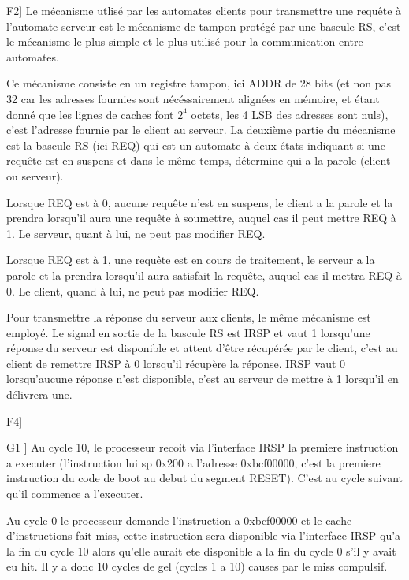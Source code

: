 \documentclass{article}
\begin{document}
F2]
Le mécanisme utlisé par les automates clients pour transmettre une requête
à l'automate serveur est le mécanisme de tampon protégé par une bascule RS,
c'est le mécanisme le plus simple et le plus utilisé pour la communication
entre automates.

Ce mécanisme consiste en un registre tampon, ici ADDR de 28 bits
(et non pas 32 car les adresses fournies sont nécéssairement alignées en
mémoire, et étant donné que les lignes de caches font $2^4$ octets, les 4 LSB
des adresses sont nuls), c'est l'adresse fournie par le client au serveur.
La deuxième partie du mécanisme est la bascule RS (ici REQ) qui est un automate
à deux états indiquant si une requête est en suspens et dans le même temps,
détermine qui a la parole (client ou serveur).

Lorsque REQ est à 0, aucune requête n'est en suspens, le client a la parole et
la prendra lorsqu'il aura une requête à soumettre, auquel cas il peut mettre
REQ à 1. Le serveur, quant à lui, ne peut pas modifier REQ.

Lorsque REQ est à 1, une requête est en cours de traitement, le serveur a la
parole et la prendra lorsqu'il aura satisfait la requête, auquel cas il mettra
REQ à 0. Le client, quand à lui, ne peut pas modifier REQ.


Pour transmettre la réponse du serveur aux clients, le même mécanisme est
employé. Le signal en sortie de la bascule RS est IRSP et vaut 1 lorsqu'une
réponse du serveur est disponible et attent d'être récupérée par le client,
c'est au client de remettre IRSP à 0 lorsqu'il récupère la réponse.
IRSP vaut 0 lorsqu'aucune réponse n'est disponible, c'est au serveur de mettre
à 1 lorsqu'il en délivrera une.

F4]


G1 ]
Au cycle 10, le processeur recoit via l'interface IRSP la premiere instruction
a executer (l'instruction lui sp 0x200 a l'adresse 0xbcf00000, c'est la
premiere instruction du code de boot au debut du segment RESET).
C'est au cycle suivant qu'il commence a l'executer.

Au cycle 0 le processeur demande l'instruction a 0xbcf00000 et le cache
d'instructions fait miss, cette instruction sera disponible via l'interface IRSP
qu'a la fin du cycle 10 alors qu'elle aurait ete disponible a la fin du cycle 0
s'il y avait eu hit. Il y a donc 10 cycles de gel (cycles 1 a 10) causes par
le miss compulsif.



\end{document}
